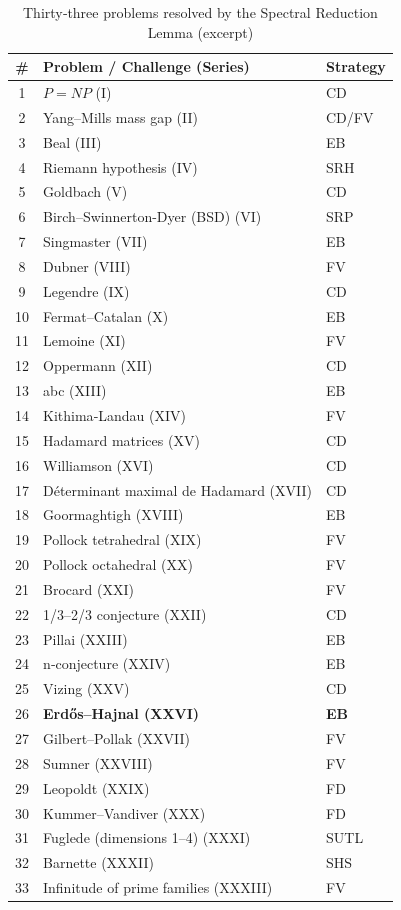 \documentclass[11pt,a4paper]{article}
\begin{document}
\begin{center}
\small
\begin{longtable}{@{}cll@{}}
\caption{Thirty‑three problems resolved by the Spectral Reduction Lemma (excerpt)}\\
\toprule
\# & Problem / Challenge (Series) & Strategy \\
\midrule
1 & \(P = NP\) (I) & CD \\
2 & Yang–Mills mass gap (II) & CD/FV \\
3 & Beal (III) & EB \\
4 & Riemann hypothesis (IV) & SRH \\
5 & Goldbach (V) & CD \\
6 & Birch–Swinnerton-Dyer (BSD) (VI) & SRP \\
7 & Singmaster (VII) & EB \\
8 & Dubner (VIII) & FV \\
9 & Legendre (IX) & CD \\
10 & Fermat–Catalan (X) & EB \\
11 & Lemoine (XI) & FV \\
12 & Oppermann (XII) & CD \\
13 & abc (XIII) & EB \\
14 & Kithima‑Landau (XIV) & FV \\
15 & Hadamard matrices (XV) & CD \\
16 & Williamson (XVI) & CD \\
17 & Déterminant maximal de Hadamard (XVII) & CD \\
18 & Goormaghtigh (XVIII) & EB \\
19 & Pollock tetrahedral (XIX) & FV \\
20 & Pollock octahedral (XX) & FV \\
21 & Brocard (XXI) & FV \\
22 & 1/3–2/3 conjecture (XXII) & CD \\
23 & Pillai (XXIII) & EB \\
24 & n‑conjecture (XXIV) & EB \\
25 & Vizing (XXV) & CD \\
26 & \textbf{Erdős–Hajnal (XXVI)} & \textbf{EB} \\
27 & Gilbert–Pollak (XXVII) & FV \\
28 & Sumner (XXVIII) & FV \\
29 & Leopoldt (XXIX) & FD \\
30 & Kummer–Vandiver (XXX) & FD \\
31 & Fuglede (dimensions 1–4) (XXXI) & SUTL \\
32 & Barnette (XXXII) & SHS \\
33 & Infinitude of prime families (XXXIII) & FV \\
\bottomrule
\end{longtable}
\end{center}
\end{document}
